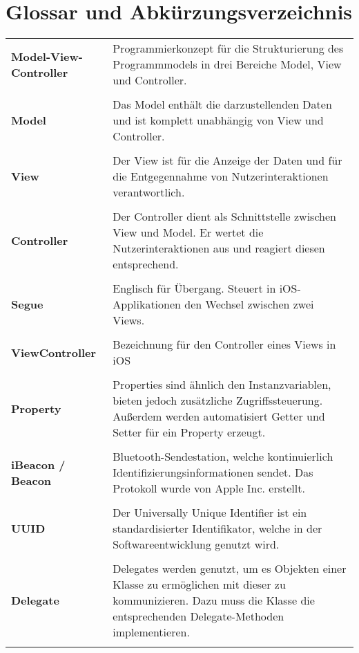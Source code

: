\chapter{Glossar und Abkürzungsverzeichnis}


\begin{tabular}[t]{lp{10cm}}
	\textbf{Model-View-Controller} & Programmierkonzept für die Strukturierung des Programmmodels in drei Bereiche Model, View und Controller. \\ \\
	\textbf{Model} & Das Model enthält die darzustellenden Daten und ist komplett unabhängig von View und Controller. \\ \\
	\textbf{View} & Der View ist für die Anzeige der Daten und für die Entgegennahme von Nutzerinteraktionen verantwortlich. \\ \\
	\textbf{Controller} & Der Controller dient als Schnittstelle zwischen View und Model. Er wertet die Nutzerinteraktionen aus und reagiert diesen entsprechend. \\ \\
	\textbf{Segue} & Englisch für Übergang. Steuert in iOS-Applikationen den Wechsel zwischen zwei Views. \\ \\
	\textbf{ViewController} & Bezeichnung für den Controller eines Views in iOS \\ \\
	\textbf{Property} & Properties sind ähnlich den Instanzvariablen, bieten jedoch zusätzliche Zugriffssteuerung. Außerdem werden automatisiert Getter und Setter für ein Property erzeugt. \\ \\
    \textbf{iBeacon / Beacon} & Bluetooth-Sendestation, welche kontinuierlich Identifizierungsinformationen sendet. Das Protokoll wurde von Apple Inc. erstellt. \\ \\
	\textbf{UUID} & Der Universally Unique Identifier ist ein standardisierter Identifikator, welche in der Softwareentwicklung genutzt wird. \\ \\
	\textbf{Delegate} & Delegates werden genutzt, um es Objekten einer Klasse zu ermöglichen mit dieser zu kommunizieren. Dazu muss die Klasse die entsprechenden Delegate-Methoden implementieren. \\ \\
 
 \end{tabular}
  
